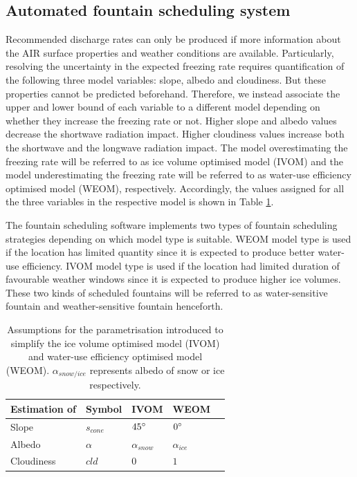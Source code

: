 \subsection{Automated fountain scheduling system}

Recommended discharge rates can only be produced if more information about the AIR surface properties and
weather conditions are available. Particularly, resolving the uncertainty in the expected freezing rate requires
quantification of the following three model variables: slope, albedo and cloudiness. But these properties cannot
be predicted beforehand. Therefore, we instead associate the upper and lower bound of each variable to a
different model depending on whether they increase the freezing rate or not. Higher slope and albedo values
decrease the shortwave radiation impact. Higher cloudiness values increase both the shortwave and the longwave
radiation impact. The model overestimating the freezing rate will be referred to as ice volume optimised model
(IVOM) and the model underestimating the freezing rate will be referred to as water-use efficiency optimised
model (WEOM), respectively. Accordingly, the values assigned for all the three variables in the respective model
is shown in Table \ref{tab:assumptions}.

The fountain scheduling software implements two types of fountain scheduling strategies depending on which
model type is suitable. WEOM model type is used if the location has limited quantity since it is expected to
produce better water-use efficiency. IVOM model type is used if the location had limited duration of favourable
weather windows since it is expected to produce higher ice volumes. These two kinds of scheduled fountains will
be referred to as water-sensitive fountain and weather-sensitive fountain henceforth.

\begin{table}[htb]
\centering
\caption{Assumptions for the parametrisation introduced to simplify the ice volume optimised model (IVOM) and
water-use efficiency optimised model (WEOM). $\alpha_{snow/ice}$ represents albedo of snow or ice respectively.}
\label{tab:assumptions}
\begin{tabular}{|lllll|}
\toprule
\textbf{Estimation of} & \textbf{Symbol} & \textbf{IVOM} & \textbf{WEOM} & \\\midrule
\multicolumn{1}{|l}{Slope}        & $s_{cone}$ & $ 45 ^{\circ} $ & $0 ^{\circ}$ & \multicolumn{1}{l|}{} \\ 
\multicolumn{1}{|l}{Albedo} & $\alpha$ & $\alpha_{snow}$ & $\alpha_{ice}$ & \multicolumn{1}{l|}{} \\
\multicolumn{1}{|l}{Cloudiness}  & $cld$ & $0$ & $1$ & \multicolumn{1}{l|}{} \\\bottomrule 
\end{tabular}
\end{table}

